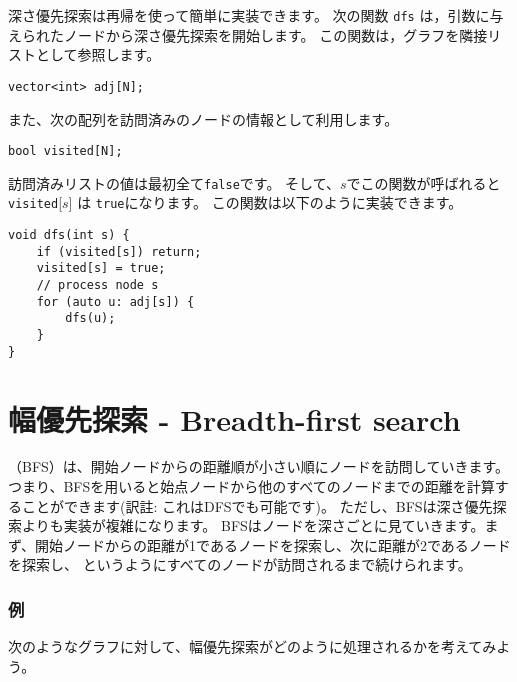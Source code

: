 深さ優先探索は再帰を使って簡単に実装できます。
次の関数  \texttt{dfs}  は，引数に与えられたノードから深さ優先探索を開始します。
この関数は，グラフを隣接リストとして参照します。
\begin{lstlisting}
vector<int> adj[N];
\end{lstlisting}
また、次の配列を訪問済みのノードの情報として利用します。
\begin{lstlisting}
bool visited[N];
\end{lstlisting}
訪問済みリストの値は最初全て\texttt{false}です。
そして、$s$でこの関数が呼ばれると\texttt{visited}[$s$] は \texttt{true}になります。
この関数は以下のように実装できます。
\begin{lstlisting}
void dfs(int s) {
    if (visited[s]) return;
    visited[s] = true;
    // process node s
    for (auto u: adj[s]) {
        dfs(u);
    }
}
\end{lstlisting}

\section{幅優先探索 - Breadth-first search}


 （BFS）は、開始ノードからの距離順が小さい順にノードを訪問していきます。
つまり、BFSを用いると始点ノードから他のすべてのノードまでの距離を計算することができます(訳註: これはDFSでも可能です)。
ただし、BFSは深さ優先探索よりも実装が複雑になります。
BFSはノードを深さごとに見ていきます。まず、開始ノードからの距離が1であるノードを探索し、次に距離が2であるノードを探索し、
というようにすべてのノードが訪問されるまで続けられます。

\subsubsection*{例}
次のようなグラフに対して、幅優先探索がどのように処理されるかを考えてみよう。

\begin{center}
\end{center}

